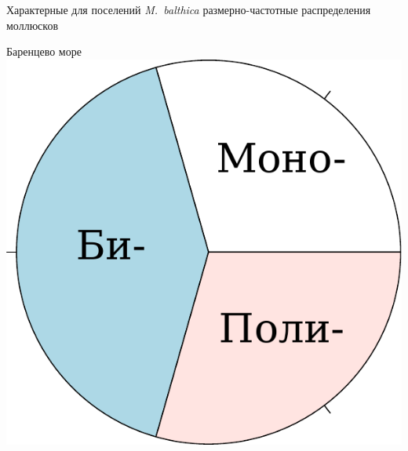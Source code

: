 \documentclass{beamer}
\begin{document}
\begin{frame}{Характерные для поселений {\it M.~balthica} размерно-частотные распределения моллюсков}
\begin{minipage}[t]{.48\linewidth}
\begin{center}
{\footnotesize Баренцево море}\\
			\includegraphics[height=.2\textheight]{Barents_freq_types.pdf}
		\end{center}
	\end{minipage}

\hrulefill


\end{frame}
\end{document}
